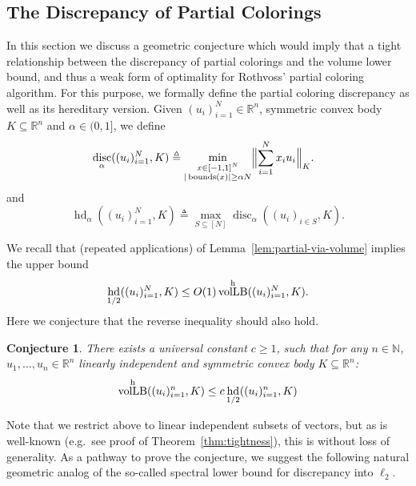 \documentclass[11pt]{article}
\newtheorem{conjecture}[theorem]{Conjecture}
\newcommand{\R}{{\mathbb{R}}}
\newcommand{\N}{{\mathbb{N}}}
\newcommand{\eqdef}{\triangleq}
\DeclareMathOperator{\vollb}{volLB}
\DeclareMathOperator{\disc}{disc}
\DeclareMathOperator{\hd}{hd}
\DeclareMathOperator{\bnds}{bounds}
\begin{document}
\subsection{The Discrepancy of Partial Colorings}
\label{sec:rip-convex}

In this section we discuss a geometric conjecture which would imply that a tight
relationship between the discrepancy of partial colorings and the volume lower
bound, and thus a weak form of optimality for Rothvoss' partial coloring
algorithm. For this purpose, we formally define the partial coloring discrepancy
as well as its hereditary version. Given $(u_i)_{i=1}^N \in \R^n$, symmetric
convex body $K \subseteq \R^n$ and $\alpha \in (0,1]$,  we define  
\begin{equation}
\label{def:partial-disc}
\begin{split}
&\disc_\alpha(( u_i)_{i=1}^N,K) \eqdef \min_{\substack{x \in [-1,1]^N \\
|\bnds(x)| \geq \alpha N}} \Bigl\|\sum_{i=1}^N x_i u_i\Bigr\|_K .
\end{split}
\end{equation}
and
\begin{equation}
\label{def:partial-hd}
\hd_\alpha((u_i)_{i=1}^N,K) \eqdef \max_{S \subseteq [N]} \disc_\alpha((u_i)_{i \in S}, K) .
\end{equation}

We recall that (repeated applications) of Lemma~\ref{lem:partial-via-volume}
implies the upper bound
\[
\hd_{1/2}((u_i)_{i=1}^N,K) \leq O(1) \vollb^{\rm h}((u_i)_{i=1}^N,K).
\]
Here we conjecture that the reverse inequality should also hold.

\begin{conjecture}
\label{conj:partial-volume}
There exists a universal constant $c \geq 1$, such that for any $n \in \N$,
$u_1,\dots,u_n \in \R^n$ linearly independent and symmetric convex body $K
\subseteq \R^n$: 
\begin{equation}
\vollb^{\rm h}((u_i)_{i=1}^n,K) \leq c \hd_{1/2}((u_i)_{i=1}^n,K)
\end{equation}
\end{conjecture}

Note that we restrict above to linear independent subsets of vectors, but as is
well-known (e.g.~see proof of Theorem~\ref{thm:tightness}), this is without loss
of generality. As a pathway to prove the conjecture, we suggest the following
natural geometric analog of the so-called spectral lower bound for discrepancy
into $\ell_2$.
\end{document}
